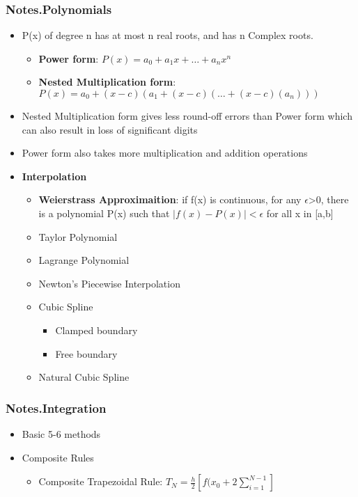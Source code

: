 \documentclass[12pt,letterpaper]{article}
\newcommand\asgnname{Notes}         %
\newenvironment{answer}[1]{
  \subsubsection*{%
  \asgnname.#1}
}{\newpage}
\begin{document}
\begin{answer}{Polynomials}
\begin{itemize}
    \item P(x) of degree n has at most n real roots, and has n Complex roots.
    \begin{itemize}
        \item \textbf{Power form}: $P(x) = a_0 + a_1x + \ldots + a_nx^n$
        \item \textbf {Nested Multiplication form}: $P(x) = a_0 + (x-c)(a_1+ (x-c)(\ldots+(x-c)(a_n)))$
    \end{itemize}
    \item Nested Multiplication form gives less round-off errors than Power form which can also result in loss of significant digits
    \item Power form also takes more multiplication and addition operations
    \item \textbf {Interpolation}
    \begin{itemize}
        \item \textbf{Weierstrass Approximaition}: if f(x) is continuous, for any $\epsilon$>0, there is a polynomial P(x) such that $\mid f(x)-P(x)\mid <\epsilon$ for all x in [a,b]
        \item Taylor Polynomial
        \item Lagrange Polynomial
        \item Newton's Piecewise Interpolation
        \item Cubic Spline
        \begin{itemize}
            \item Clamped boundary
            \item Free boundary
        \end{itemize}
        \item Natural Cubic Spline
    \end{itemize}
\end{itemize}
\end{answer}

\begin{answer}{Integration}
\begin{itemize}
    \item Basic 5-6 methods
    \item Composite Rules
    \begin{itemize}
        \item Composite Trapezoidal Rule: $T_N = \frac{h}{2} [f(x_0 + 2\sum _{i=1}^{N-1}]$
    \end{itemize}
    
\end{itemize}
\end{answer}
\end{document}
